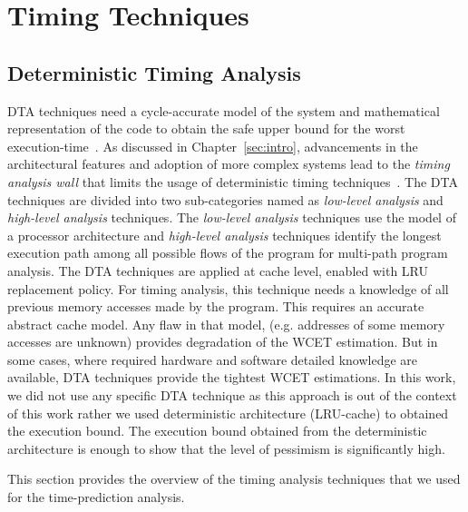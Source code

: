 \section{Timing Techniques}
\subsection{Deterministic Timing Analysis}
\label{timing techniques}
DTA techniques need a cycle-accurate model of the system and mathematical representation of the code to obtain the safe upper bound for the worst execution-time~\cite{wilhelm2008worst}. As discussed in Chapter~\ref{sec:intro}, advancements in the architectural features and adoption of more complex systems lead to the \textit {timing analysis wall} that limits the usage of  deterministic timing techniques~\cite{zhou:spta}. The DTA techniques are divided into two sub-categories named as \textit{low-level analysis} and \textit{high-level analysis} techniques. The \textit{low-level analysis} techniques use the model of a processor architecture and \textit{high-level analysis} techniques identify the longest execution path among all possible flows of the program for multi-path program analysis. The DTA techniques are applied at cache level, enabled with LRU replacement policy. For timing analysis, this technique needs a knowledge of all previous memory accesses made by the program. This requires an accurate abstract cache model. Any flaw in that model, (e.g. addresses of some memory accesses are unknown) provides degradation of the WCET estimation. But in some cases, where required hardware and software detailed knowledge are available, DTA techniques provide the tightest WCET estimations. In this work, we did not use any specific DTA technique as this approach is out of the context of this work rather we used deterministic architecture (LRU-cache) to obtained the execution bound. The execution bound obtained from the deterministic architecture is enough to show that the level of pessimism is significantly high.



This section provides the overview of the timing analysis techniques that we used for the time-prediction analysis.

